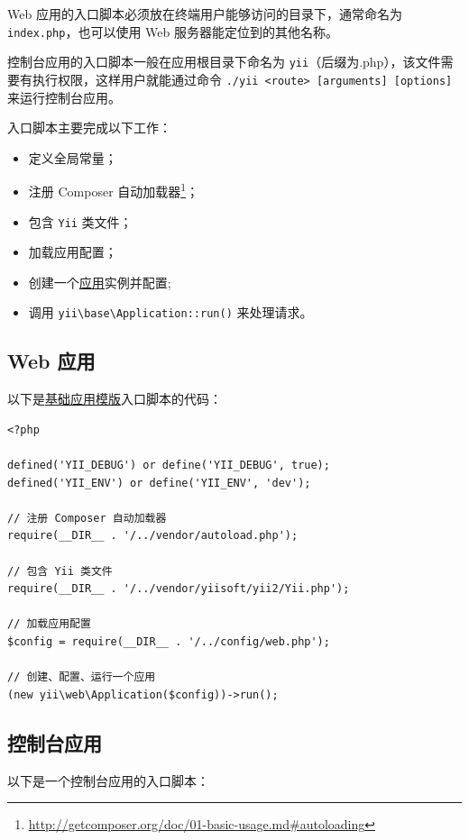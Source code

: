 Web 应用的入口脚本必须放在终端用户能够访问的目录下，通常命名为 \lstinline|index.php|，也可以使用 Web 服务器能定位到的其他名称。

控制台应用的入口脚本一般在应用根目录下命名为 \lstinline|yii|（后缀为.php），该文件需要有执行权限，这样用户就能通过命令 \lstinline|./yii <route> [arguments] [options]| 来运行控制台应用。

入口脚本主要完成以下工作：

\begin{itemize}
\item 定义全局常量；
\item 注册 Composer 自动加载器\footnote{\url{http://getcomposer.org/doc/01-basic-usage.md\#autoloading}}；
\item 包含 \texttt{Yii} 类文件；
\item 加载应用配置；
\item 创建一个\hyperref[structure-applications.md]{应用}实例并配置;
\item 调用 \texttt{yii{\allowbreak{}\textbackslash}base{\allowbreak{}\textbackslash}Application\allowbreak{}::\allowbreak{}run()} 来处理请求。
\end{itemize}
\subsection{Web 应用 \label{structure-entry-scripts.md::web-applications}}
以下是\hyperref[start-installation.md]{基础应用模版}入口脚本的代码：

\lstset{language=php}\begin{lstlisting}
<?php

defined('YII_DEBUG') or define('YII_DEBUG', true);
defined('YII_ENV') or define('YII_ENV', 'dev');

// 注册 Composer 自动加载器
require(__DIR__ . '/../vendor/autoload.php');

// 包含 Yii 类文件
require(__DIR__ . '/../vendor/yiisoft/yii2/Yii.php');

// 加载应用配置
$config = require(__DIR__ . '/../config/web.php');

// 创建、配置、运行一个应用
(new yii\web\Application($config))->run();
\end{lstlisting}
\subsection{控制台应用 \label{structure-entry-scripts.md::console-applications}}
以下是一个控制台应用的入口脚本：

